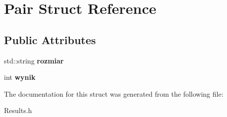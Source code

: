 \hypertarget{struct_pair}{}\section{Pair Struct Reference}
\label{struct_pair}
\subsection*{Public Attributes}
\begin{DoxyCompactItemize}
\item 
\hypertarget{struct_pair_ac7bc0b37d632674e21e292a1bfc64847}{}std\+::string {\bfseries rozmiar}\label{struct_pair_ac7bc0b37d632674e21e292a1bfc64847}

\item 
\hypertarget{struct_pair_a166971bff5d8b86e25f71dc1d1252daf}{}int {\bfseries wynik}\label{struct_pair_a166971bff5d8b86e25f71dc1d1252daf}

\end{DoxyCompactItemize}


The documentation for this struct was generated from the following file\+:\begin{DoxyCompactItemize}
\item 
Results.\+h\end{DoxyCompactItemize}
